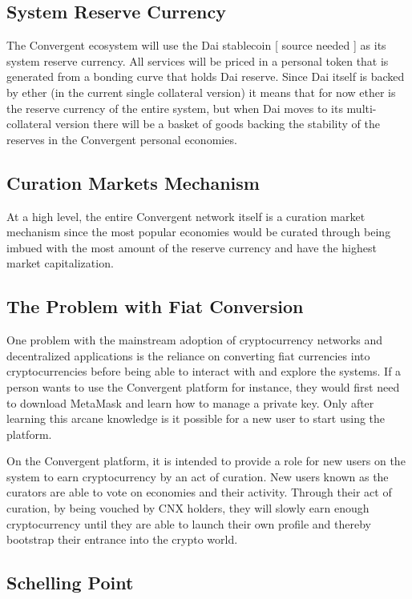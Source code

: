 \documentclass[a4paper, 10pt]{article}
\begin{document}
\subsection{System Reserve Currency}

The Convergent ecosystem will use the Dai stablecoin [ source needed ] as its system reserve currency. All services will be priced in a personal token that is generated from a bonding curve that holds Dai reserve. Since Dai itself is backed by ether (in the current single collateral version) it means that for now ether is the reserve currency of the entire system, but when Dai moves to its multi-collateral version there will be a basket of goods backing the stability of the reserves in the Convergent personal economies.

\subsection{Curation Markets Mechanism}

At a high level, the entire Convergent network itself is a curation market mechanism since the most popular economies would be curated through being imbued with the most amount of the reserve currency and have the highest market capitalization. 

\subsection{The Problem with Fiat Conversion}

One problem with the mainstream adoption of cryptocurrency networks and decentralized applications is the reliance on converting fiat currencies into cryptocurrencies before being able to interact with and explore the systems. If a person wants to use the Convergent platform for instance, they would first need to download MetaMask and learn how to manage a private key. Only after learning this arcane knowledge is it possible for a new user to start using the platform. 

On the Convergent platform, it is intended to provide a role for new users on the system to earn cryptocurrency by an act of curation. New users known as the curators are able to vote on economies and their activity. Through their act of curation, by being vouched by CNX holders, they will slowly earn enough cryptocurrency until they are able to launch their own profile and thereby bootstrap their entrance into the crypto world.

\subsection{Schelling Point}
\end{document}
